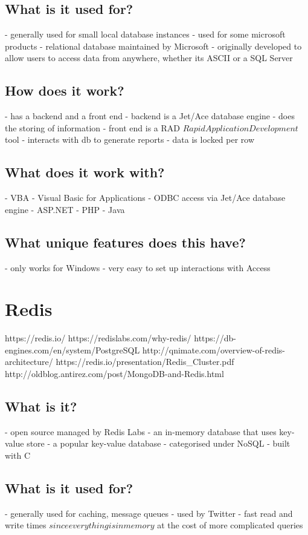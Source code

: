 \section{What is it used for?}
- generally used for small local database instances
- used for some microsoft products
- relational database maintained by Microsoft
- originally developed to allow users to access data from anywhere, whether its ASCII or a SQL Server

\section{How does it work?}
- has a backend and a front end
- backend is a Jet/Ace database engine - does the storing of information
- front end is a RAD \(Rapid Application Development\) tool - interacts with db to generate reports
- data is locked per row

\section{What does it work with?}
- VBA - Visual Basic for Applications
- ODBC access via Jet/Ace database engine
- ASP.NET
- PHP
- Java

\section{What unique features does this have?}
- only works for Windows
- very easy to set up interactions with Access

\chapter{Redis}
https://redis.io/
https://redislabs.com/why-redis/
https://db-engines.com/en/system/PostgreSQL%
http://qnimate.com/overview-of-redis-architecture/
https://redis.io/presentation/Redis_Cluster.pdf
http://oldblog.antirez.com/post/MongoDB-and-Redis.html

\section{What is it?}
- open source managed by Redis Labs
- an in-memory database that uses key-value store
- a popular key-value database - categorised under NoSQL
- built with C

\section{What is it used for?}
- generally used for caching, message queues
- used by Twitter
- fast read and write times \(since everything is in memory\) at the cost of more complicated queries

